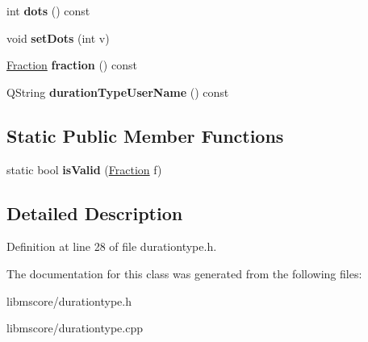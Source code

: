 \begin{DoxyCompactItemize}
int {\bfseries dots} () const
\item 
\mbox{\label{class_ms_1_1_t_duration_af111928e25b26476ec35a3300aed2eec}} 
void {\bfseries set\+Dots} (int v)
\item 
\mbox{\label{class_ms_1_1_t_duration_a5f699dd041973be93c8bef472927ee5f}} 
\hyperlink{class_ms_1_1_fraction}{Fraction} {\bfseries fraction} () const
\item 
\mbox{\label{class_ms_1_1_t_duration_a1d7fa0f0375914c8813b599e84993a10}} 
Q\+String {\bfseries duration\+Type\+User\+Name} () const
\end{DoxyCompactItemize}
\subsection*{Static Public Member Functions}
\begin{DoxyCompactItemize}
\item 
\mbox{\label{class_ms_1_1_t_duration_a58b7d65bbf6052edf7448bdc65ecab8c}} 
static bool {\bfseries is\+Valid} (\hyperlink{class_ms_1_1_fraction}{Fraction} f)
\end{DoxyCompactItemize}


\subsection{Detailed Description}


Definition at line 28 of file durationtype.\+h.



The documentation for this class was generated from the following files\+:\begin{DoxyCompactItemize}
\item 
libmscore/durationtype.\+h\item 
libmscore/durationtype.\+cpp\end{DoxyCompactItemize}
